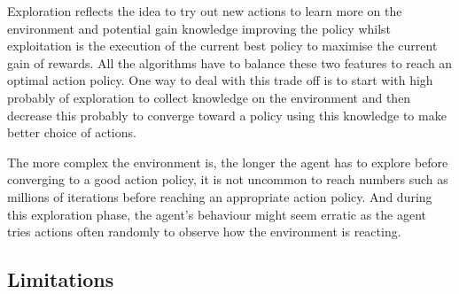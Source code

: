 	Exploration reflects the idea to try out new actions to learn more on the environment and potential gain knowledge improving the policy whilst exploitation is the execution of the current best policy to maximise the current gain of rewards. All the algorithms have to balance these two features to reach an optimal action policy. One way to deal with this trade off is to start with high probably of exploration to collect knowledge on the environment and then decrease this probably to converge toward a policy using this knowledge to make better choice of actions.
	
	The more complex the environment is, the longer the agent has to explore before converging to a good action policy, it is not uncommon to reach numbers such as millions of iterations before reaching an appropriate action policy. And during this exploration phase, the agent's behaviour might seem erratic as the agent tries actions often randomly to observe how the environment is reacting.
	
	
\subsection{Limitations}


